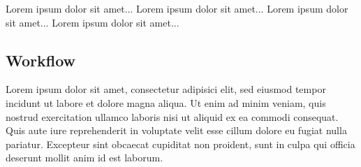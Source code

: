 
Lorem ipsum dolor sit amet...
Lorem ipsum dolor sit amet...
Lorem ipsum dolor sit amet...
Lorem ipsum dolor sit amet...



\subsection{Workflow}
\label{subsec:workflow}
Lorem ipsum dolor sit amet, consectetur adipisici elit, sed eiusmod tempor incidunt ut labore et dolore magna aliqua. Ut enim ad minim veniam, quis nostrud exercitation ullamco laboris nisi ut aliquid ex ea commodi consequat. Quis aute iure reprehenderit in voluptate velit esse cillum dolore eu fugiat nulla pariatur. Excepteur sint obcaecat cupiditat non proident, sunt in culpa qui officia deserunt mollit anim id est laborum.\\

\clearpage
\newpage

